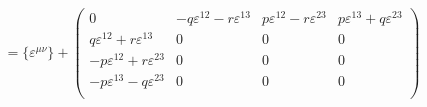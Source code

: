 \begin{equation}
=\{\varepsilon^{\mu\nu}\} + \left( \begin{array} {cccc}
0 & -q\varepsilon^{12} - r \varepsilon^{13} & p\varepsilon^{12} - r \varepsilon^{23} & p\varepsilon^{13} + q \varepsilon^{23} \\
q\varepsilon^{12} + r \varepsilon^{13} & 0 & 0& 0 \\
-p\varepsilon^{12} + r \varepsilon^{23}& 0 & 0& 0 \\
- p\varepsilon^{13} - q \varepsilon^{23}& 0 & 0& 0 \\
\end{array} \right)
\label{n15}
\end{equation}

